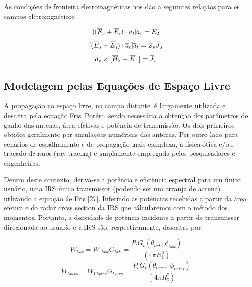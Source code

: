\documentclass[
	12pt,				%
	openright,			%
	oneside,			%
	a4paper,			%
	english,			%
	brazil				%
	]{abntex2}
\begin{document}
As condições de fronteira eletromagnéticas nos dão a seguintes relaçãos para os campos elétromgnéticos

\begin{equation}{\label{BoundaryFields}}
 [(\overline{E}_s+\overline{E}_{i})\cdot \overline{a}_t]\overline{a}_t=E_2
\end{equation}
\begin{equation}{\label{BoundaryFieldsImp}}
 [(\overline{E}_s+\overline{E}_{i})\cdot \overline{a}_t]\overline{a}_t=Z_s\overline{J}_{s}
\end{equation}
\begin{equation}{\label{BoundaryCurrent}}
  \overline{a}_z  \times [{\overline{H}_{2}-\overline{H}_{1}} ]=\overline{J}_{s}
\end{equation}


\subsection{Modelagem pelas Equações de Espaço Livre}\label{FormulaçãoFreeSpace
Balanis}

A propagação no espaço livre, no campo distante, é largamente utilizada e descrita pela equação Fris. Porém, sendo necessária a obtenção dos parâmetros de ganho das antenas, área efetivas e potência de transmissão. Os dois primeiros obtidos geralmente por simulações numéricas das antenas. Por outro lado para cenários de espalhamento e de propagação mais complexa, a física ótica e/ou traçado de raios (ray tracing) é amplamente empregado pelos pesquisadores e engenheiros.

Dentro deste contexto, deriva-se a potência e eficiência espectral para um único usuário, uma IRS único transmissor (podendo ser um arranjo de antena) utlizando a equação de Fris {[}27{]}. Inferindo as potências
recebidas a partir da área efetiva e do radar cross section da IRS que cálcularemos com o método dos momentos. Portanto, a densidade de potência incidente a partir do transmissor direcionada ao usúario e à IRS são, respectivamente, descritas por,

\begin{equation}
W_{txk} = W_{0txk}G_{txk} = \frac{P_{t}G_{t}(\theta_{txk},\phi_{txk})}{(4\pi R_{1}^{2})}
\end{equation}
\begin{equation}
    W_{txirs} = W_{0txirs}G_{txirs} = \frac{P_{t}G_{t}(\theta_{txirs},\phi_{txirs})}{(4\pi R_{2}^{2})}
\end{equation}
\end{document}

